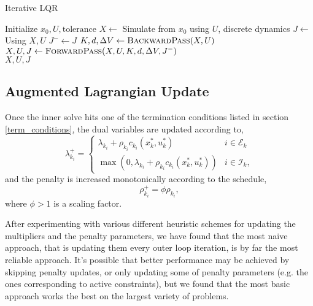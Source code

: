 \documentclass[../root.tex]{subfiles}
\begin{document}
\begin{algorithm}
\begin{algorithmic}[1]
\caption{Iterative LQR} \label{alg:iLQR}
\State Initialize $x_0, U, \text{tolerance}$
\State $X \leftarrow$ Simulate from $x_0$ using $U$, discrete dynamics
    \State $J \leftarrow$ Using $X, U$
    \Do
        \State $J^{-} \leftarrow J$
        \State $K,d, \Delta V \leftarrow \textproc{BackwardPass}(X,U)$
        \State $X, U, J \leftarrow \textproc{ForwardPass}(X,U,K,d,\Delta V,J^{-})$
     \\
    \Return $X,U,J$
\EndFunction
\end{algorithmic}
\end{algorithm}

\subsection{Augmented Lagrangian Update}
    Once the inner solve hits one of the termination conditions listed in section
    \ref{term_conditions}, the dual variables are updated according to,
    \begin{equation} \label{eq:dual_update}
        \lambda_{k_i}^{+} = \begin{cases}
        \lambda_{k_i} + \rho_{k_i} c_{k_i}(x_k^*,u_k^*) & i \in \mathcal{E}_k \\
        \max (0,\lambda_{k_i} + \rho_{k_i} c_{k_i}(x_k^*,u_k^*)) & i \in \mathcal{I}_k,
        \end{cases}
    \end{equation} 
    and the penalty is increased monotonically according to the schedule,
    \begin{equation} \label{eq:penalty_update}
        \rho_{k_i}^+ = \phi \rho_{k_i},
    \end{equation}
    where $\phi > 1$ is a scaling factor.

    After experimenting with various different heuristic schemes for updating
    the multipliers and the penalty parameters, we have found that the most
    naive approach, that is updating them every outer loop iteration, is by
    far the most reliable approach. It's possible that better performance may
    be achieved by skipping penalty updates, or only updating some of penalty
    parameters (e.g. the ones corresponding to active constraints), but we
    found that the most basic approach works the best on the largest variety
    of problems.
\end{document}
